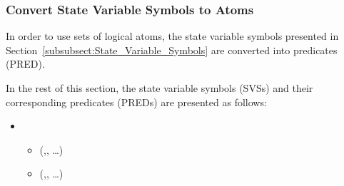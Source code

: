 \subsubsection{Convert State Variable Symbols to Atoms}
In order to use sets of logical atoms, the state variable symbols presented in Section~\ref{subsubsect:State_Variable_Symbols} are converted into predicates (PRED).

In the rest of this section, the state variable symbols (SVSs) and their corresponding predicates (PREDs) are presented as follows:
\begin{itemize}
 \item {}
  \begin{itemize}
  \item {} (,, \ldots)
  \item {} (,, \ldots)
  \end{itemize}
\end{itemize}


